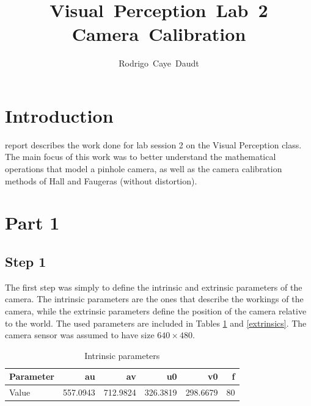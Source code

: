\documentclass[journal]{IEEEtran}
\begin{document}
\title{Visual~Perception~Lab~2 \\ Camera~Calibration}
%

\author{Rodrigo~Caye~Daudt}




\maketitle



\section{Introduction}

 report describes the work done for lab session 2 on the Visual Perception class. The main focus of this work was to better understand the mathematical operations that model a pinhole camera, as well as the camera calibration methods of Hall and Faugeras (without distortion).

\section{Part 1}\label{p1}

\subsection{Step 1}

The first step was simply to define the intrinsic and extrinsic parameters of the camera. The intrinsic parameters are the ones that describe the workings of the camera, while the extrinsic parameters define the position of the camera relative to the world. The used parameters are included in Tables \ref{intrinsics} and \ref{extrinsics}. The camera sensor was assumed to have size $640\times 480$.

\begin{table}[H]
	\caption{Intrinsic parameters}
	\centering
	\begin{tabular}{l | r r r r r}\label{intrinsics}
		Parameter & au & av & u0 & v0 & f\\
		\hline
		Value & 557.0943 & 712.9824 & 326.3819 & 298.6679 & 80\\
	\end{tabular}
\end{table}
\end{document}
